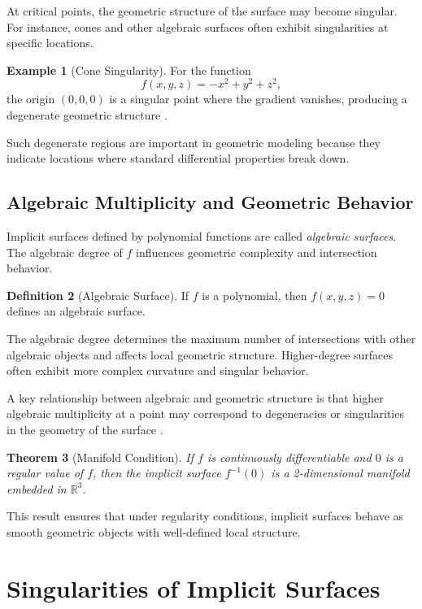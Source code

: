\documentclass[12pt, a4paper, oneside]{book}
\theoremstyle{plain}
\newtheorem{theorem}{Theorem}[chapter]
\theoremstyle{definition}
\newtheorem{definition}[theorem]{Definition}
\newtheorem{example}[theorem]{Example}
\theoremstyle{remark}
\theoremstyle{definition}
\begin{document}
At critical points, the geometric structure of the surface may become singular. For instance, cones and other algebraic surfaces often exhibit singularities at specific locations.

\begin{example}[Cone Singularity]
For the function
\[
f(x,y,z) = -x^2 + y^2 + z^2,
\]
the origin $(0,0,0)$ is a singular point where the gradient vanishes, producing a degenerate geometric structure \cite{bloomenthal2000implicit}.
\end{example}

Such degenerate regions are important in geometric modeling because they indicate locations where standard differential properties break down.

\subsection{Algebraic Multiplicity and Geometric Behavior}

Implicit surfaces defined by polynomial functions are called \emph{algebraic surfaces}. The algebraic degree of $f$ influences geometric complexity and intersection behavior.

\begin{definition}[Algebraic Surface]
If $f$ is a polynomial, then $f(x,y,z)=0$ defines an algebraic surface.
\end{definition}

The algebraic degree determines the maximum number of intersections with other algebraic objects and affects local geometric structure. Higher-degree surfaces often exhibit more complex curvature and singular behavior.

A key relationship between algebraic and geometric structure is that higher algebraic multiplicity at a point may correspond to degeneracies or singularities in the geometry of the surface \cite{bloomenthal2000implicit}.

\begin{theorem}[Manifold Condition]
If $f$ is continuously differentiable and $0$ is a regular value of $f$, then the implicit surface $f^{-1}(0)$ is a 2-dimensional manifold embedded in $\mathbb{R}^3$.
\end{theorem}

This result ensures that under regularity conditions, implicit surfaces behave as smooth geometric objects with well-defined local structure.

\section{Singularities of Implicit Surfaces}
\end{document}
